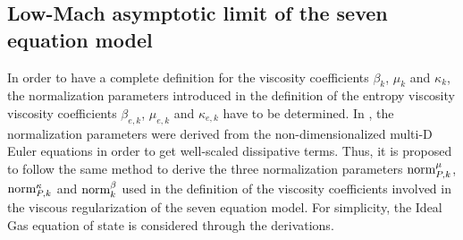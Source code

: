 \subsection{Low-Mach asymptotic limit of the seven equation model}\label{sec:low-Mach-sem}
In order to have a complete definition for the viscosity coefficients $\beta_k$, $\mu_k$ and $\kappa_k$, the normalization parameters introduced in the definition of the entropy viscosity viscosity coefficients $\beta_{e,k}$, $\mu_{e,k}$ and $\kappa_{e,k}$ have to be determined. In , the normalization parameters were derived from the non-dimensionalized multi-D Euler equations in order to get well-scaled dissipative terms. Thus, it is proposed to follow the same method to derive the three normalization parameters $\textrm{norm}_{P,k}^\mu$, $\textrm{norm}_{P,k}^\kappa$ and $\textrm{norm}_{k}^\beta$ used in the definition of the viscosity coefficients involved in the viscous regularization of the seven equation model. For simplicity, the Ideal Gas equation of state is considered through the derivations.

